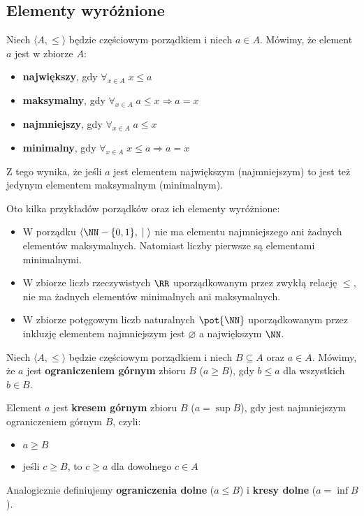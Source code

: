 \subsection{Elementy wyróżnione}
Niech $\langle A, \leq \rangle$ będzie częściowym porządkiem i niech $a \in A$. Mówimy, że element $a$ jest w zbiorze $A$:
\begin{itemize}
    \item \textbf{największy}, gdy $\forall_{x \in A} \; x \leq a$
    \item \textbf{maksymalny}, gdy $\forall_{x \in A} \; a \leq x \Rightarrow a = x$
    \item \textbf{najmniejszy}, gdy $\forall_{x \in A} \; a \leq x$
    \item \textbf{minimalny}, gdy $\forall_{x \in A} \; x \leq a \Rightarrow a = x$
\end{itemize}
Z tego wynika, że jeśli $a$ jest elementem największym (najmniejszym) to jest też jedynym elementem
maksymalnym (minimalnym).

\begin{example}
    Oto kilka przykładów porządków oraz ich elementy wyróżnione:
    \begin{itemize}
        \item W porządku $\langle \NN - \{0, 1\}, \; | \; \rangle$ nie ma elementu najmniejszego ani żadnych elementów maksymalnych. Natomiast liczby pierwsze są elementami minimalnymi.
        \item W zbiorze liczb rzeczywistych $\RR$ uporządkowanym przez zwykłą relację $\leq$, nie ma żadnych elementów minimalnych ani maksymalnych.
        \item W zbiorze potęgowym liczb naturalnych $\pot{\NN}$ uporządkowanym przez inkluzję elementem najmniejszym jest $\varnothing$ a największym $\NN$.
    \end{itemize}
\end{example}

Niech $\langle A, \leq \rangle$ będzie częściowym porządkiem i niech $B \subseteq A$ oraz $a \in A$. Mówimy, że $a$ jest \textbf{ograniczeniem górnym} zbioru $B$ ($a \geq B$), gdy $b \leq a$ dla wszystkich $b \in B$.

Element $a$ jest \textbf{kresem górnym} zbioru $B$ ($a = \sup B$), gdy jest najmniejszym ograniczeniem górnym $B$, czyli:
\begin{itemize}
    \item $a \geq B$
    \item jeśli $c \geq B$, to $c \geq a$ dla dowolnego $c \in A$
\end{itemize}
Analogicznie definiujemy \textbf{ograniczenia dolne} ($a \leq B$) i \textbf{kresy dolne} ($a = \inf B$).


